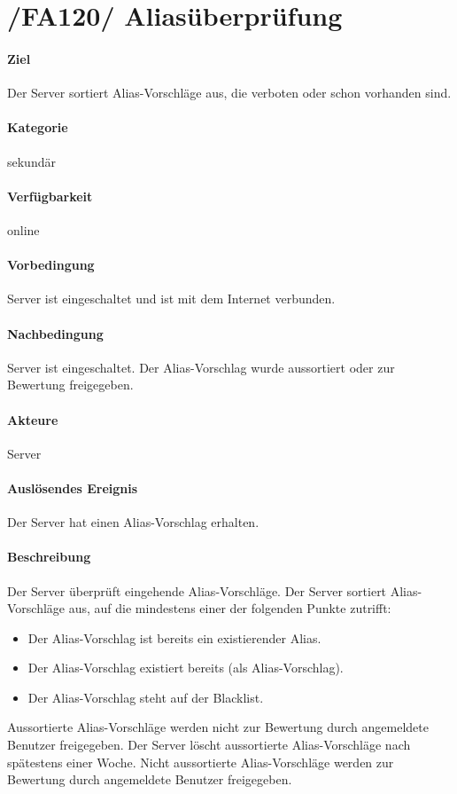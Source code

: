 \section{/FA120/ Aliasüberprüfung}
\label{/FA120/}
\paragraph{Ziel}
Der Server sortiert Alias-Vorschläge aus, die verboten oder schon vorhanden sind.
\paragraph{Kategorie}
sekundär
\paragraph{Verfügbarkeit}
online
\paragraph{Vorbedingung}
Server ist eingeschaltet und ist mit dem Internet verbunden.
\paragraph{Nachbedingung}
Server ist eingeschaltet. Der Alias-Vorschlag wurde aussortiert oder zur Bewertung freigegeben.
\paragraph{Akteure}
Server
\paragraph{Auslösendes Ereignis}
Der Server hat einen Alias-Vorschlag erhalten.
\paragraph{Beschreibung}
Der Server überprüft eingehende Alias-Vorschläge. Der Server sortiert Alias-Vorschläge aus, auf die mindestens einer der folgenden Punkte zutrifft:
\begin{itemize}
    \item Der Alias-Vorschlag ist bereits ein existierender Alias.
    \item Der Alias-Vorschlag existiert bereits (als Alias-Vorschlag).
    \item Der Alias-Vorschlag steht auf der Blacklist.
\end{itemize}
Aussortierte Alias-Vorschläge werden nicht zur Bewertung durch angemeldete Benutzer freigegeben. Der Server löscht aussortierte Alias-Vorschläge nach spätestens einer Woche. Nicht aussortierte Alias-Vorschläge werden zur Bewertung durch angemeldete Benutzer freigegeben.
